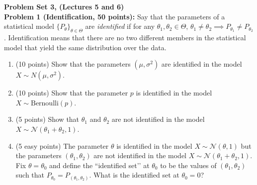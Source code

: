 \documentclass[11pt]{article} %
\begin{document}
\onehalfspace






\noindent \textbf{Problem Set 3, (Lectures 5 and 6)} \\

\noindent \textbf{Problem 1 (Identification, 50 points):} Say that the parameters of a statistical model $\{P_{\theta}\}_{\theta \in \Theta}$ are \emph{identified} if for any $\theta_1, \theta_2 \in \Theta$, $\theta_1 \neq \theta_2 \implies P_{\theta_1} \neq P_{\theta_2}$. Identification means that there are no two different members in the statistical model that yield the same distribution over the data. 

\begin{enumerate}
\item (10 points) Show that the parameters $(\mu,\sigma^2)$ are identified in the model $X \sim N(\mu, \sigma^2)$. 
\item (10 points) Show that the parameter $p$ is identified in the model $X \sim \textrm{Bernoulli}(p)$. 
\item (5 points) Show that $\theta_1$ and $\theta_2$ are not identified in the model $X \sim \mathcal{N}(\theta_1+\theta_2, 1)$. 

\item (5 easy points)  The parameter $\theta$ is identified in the model $X \sim \mathcal{N}(\theta,1)$ but the parameters $(\theta_1,\theta_2)$ are not identified in the model $X \sim \mathcal{N}(\theta_1+\theta_2, 1)$. Fix $\theta = \theta_0$ and define the ``identified set’’ at $\theta_0$ to be the values of $(\theta_1,\theta_2)$ such that $P_{\theta_0} = P_{(\theta_1,\theta_2)}$. What is the identified set at $\theta_0 = 0$?
\end{enumerate}
\end{document}
